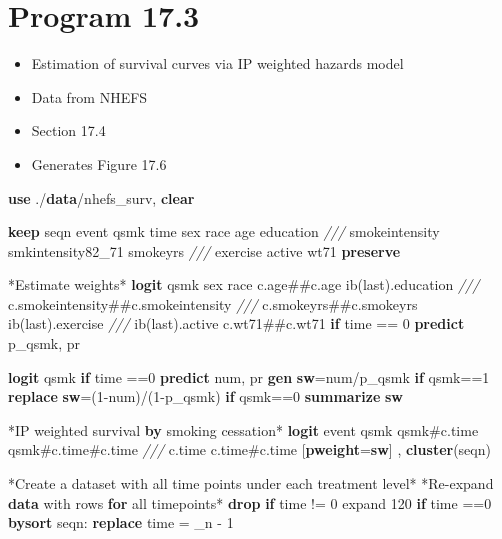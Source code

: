 \documentclass[
  10pt,
]{book}
\newenvironment{Shaded}{\begin{snugshade}}{\end{snugshade}}
\newcommand{\BaseNTok}[1]{\textcolor[rgb]{0.00,0.00,0.81}{#1}}
\newcommand{\CommentTok}[1]{\textcolor[rgb]{0.56,0.35,0.01}{\textit{#1}}}
\newcommand{\DataTypeTok}[1]{\textcolor[rgb]{0.13,0.29,0.53}{#1}}
\newcommand{\DecValTok}[1]{\textcolor[rgb]{0.00,0.00,0.81}{#1}}
\newcommand{\FunctionTok}[1]{\textcolor[rgb]{0.00,0.00,0.00}{#1}}
\newcommand{\KeywordTok}[1]{\textcolor[rgb]{0.13,0.29,0.53}{\textbf{#1}}}
\newcommand{\NormalTok}[1]{#1}
\newcommand{\OtherTok}[1]{\textcolor[rgb]{0.56,0.35,0.01}{#1}}
\providecommand{\tightlist}{%
  \setlength{\itemsep}{0pt}\setlength{\parskip}{0pt}}
\begin{document}
\hypertarget{program-17.3-1}{%
\section{Program 17.3}\label{program-17.3-1}}

\begin{itemize}
\tightlist
\item
  Estimation of survival curves via IP weighted hazards model
\item
  Data from NHEFS
\item
  Section 17.4
\item
  Generates Figure 17.6
\end{itemize}

\begin{Shaded}
\begin{Highlighting}[]
\KeywordTok{use}\NormalTok{ ./}\KeywordTok{data}\NormalTok{/nhefs\_surv, }\KeywordTok{clear}

\KeywordTok{keep}\NormalTok{ seqn event qsmk time sex race age education }\CommentTok{///}
\NormalTok{  smokeintensity smkintensity82\_71 smokeyrs }\CommentTok{///}
\NormalTok{  exercise active wt71}
\KeywordTok{preserve} 

\NormalTok{*Estimate weights*}
\KeywordTok{logit}\NormalTok{ qsmk sex race c.age\#\#c.age ib(}\FunctionTok{last}\NormalTok{).education }\CommentTok{///}
\NormalTok{  c.smokeintensity\#\#c.smokeintensity }\CommentTok{///}
\NormalTok{  c.smokeyrs\#\#c.smokeyrs ib(}\FunctionTok{last}\NormalTok{).exercise }\CommentTok{///}
\NormalTok{  ib(}\FunctionTok{last}\NormalTok{).active c.wt71\#\#c.wt71 }\KeywordTok{if}\NormalTok{ time == 0}
\KeywordTok{predict}\NormalTok{ p\_qsmk, pr}

\KeywordTok{logit}\NormalTok{ qsmk }\KeywordTok{if}\NormalTok{ time ==0 }
\KeywordTok{predict}\NormalTok{ num, pr}
\KeywordTok{gen} \KeywordTok{sw}\NormalTok{=num/p\_qsmk }\KeywordTok{if}\NormalTok{ qsmk==1}
\KeywordTok{replace} \KeywordTok{sw}\NormalTok{=(1{-}num)/(1{-}p\_qsmk) }\KeywordTok{if}\NormalTok{ qsmk==0}
\KeywordTok{summarize} \KeywordTok{sw}

\NormalTok{*IP weighted survival }\KeywordTok{by}\NormalTok{ smoking cessation*}
\KeywordTok{logit}\NormalTok{ event qsmk qsmk\#c.time qsmk\#c.time\#c.time }\CommentTok{///}
\NormalTok{  c.time c.time\#c.time [}\KeywordTok{pweight}\NormalTok{=}\KeywordTok{sw}\NormalTok{] , }\KeywordTok{cluster}\NormalTok{(seqn) }

\NormalTok{*Create a dataset with }\OtherTok{all}\NormalTok{ time points under each treatment }\DecValTok{level}\NormalTok{*}
\NormalTok{*Re{-}expand }\KeywordTok{data}\NormalTok{ with }\BaseNTok{rows} \KeywordTok{for} \OtherTok{all}\NormalTok{ timepoints*}
\KeywordTok{drop} \KeywordTok{if}\NormalTok{ time != 0}
\NormalTok{expand 120 }\KeywordTok{if}\NormalTok{ time ==0 }
\KeywordTok{bysort}\NormalTok{ seqn: }\KeywordTok{replace}\NormalTok{ time = }\DataTypeTok{\_n}\NormalTok{ {-} 1       }
        

\end{Highlighting}
\end{Shaded}
\end{document}
